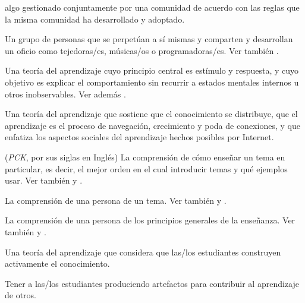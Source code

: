 \begin{description}
 algo gestionado conjuntamente por una comunidad
de acuerdo con las reglas que la misma comunidad ha desarrollado y adoptado.

 Un grupo de personas que se perpetúan a sí mismas
y comparten y desarrollan un oficio como tejedoras/es, músicas/os o programadoras/es. Ver también
.

 Una teoría del aprendizaje cuyo principio central
es estímulo y respuesta, y cuyo objetivo es explicar el comportamiento sin recurrir
a estados mentales internos u otros inobservables. Ver
además .

 Una teoría del aprendizaje que sostiene que el conocimiento se distribuye,
que el aprendizaje es el proceso de navegación, crecimiento y poda de conexiones, y que enfatiza los aspectos
sociales del aprendizaje hechos posibles por Internet.

 (\emph{PCK}, por sus siglas en Inglés) La comprensión de cómo enseñar un tema en particular, es decir, el mejor orden en el cual introducir temas y qué ejemplos usar. Ver también
y .

 La comprensión de una
persona de un tema. Ver también
y .

 La
comprensión de una persona de los principios generales de la enseñanza. Ver también
y .

 Una teoría del aprendizaje que considera que
las/los estudiantes construyen activamente el conocimiento.

 Tener a las/los estudiantes
produciendo artefactos para contribuir al aprendizaje de otros.


\end{description}
